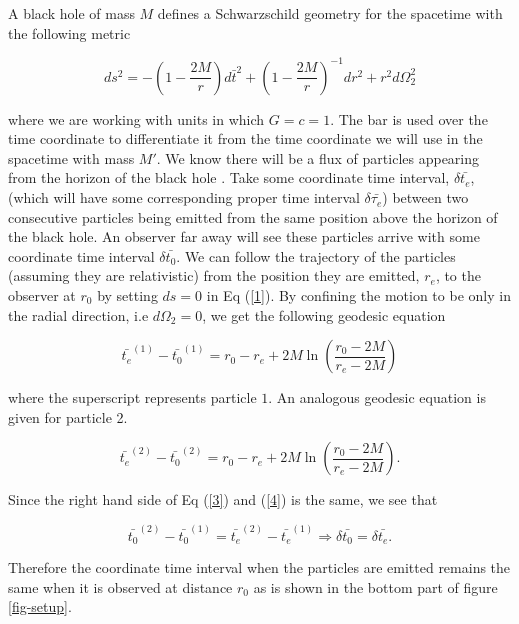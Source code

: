 \documentclass[aps,showpacs,onecolumn,floats,prd,superscriptaddress,nofootinbib]{revtex4-1}
\begin{document}
A black hole of mass $M$ defines a Schwarzschild geometry for the spacetime with the following metric 

\begin{equation}
	ds^2 = - \left( 1 -\frac{2M}{r} \right) d\bar{t}^2 + \left( 1 - \frac{2M}{r} \right)^{-1} dr^2 + r^2 d \Omega_2^2	\label{1}
\end{equation}

where we are working with units in which $G = c = 1$. The bar is used over the time coordinate to differentiate it from the time coordinate we will use in the spacetime with mass $M'$. We know there will be a flux of particles appearing from the horizon of the black hole \cite{Haw74}. Take some coordinate time interval, $\delta \bar{t_e}$, (which will have some corresponding proper time interval $\delta \bar{\tau_e}$) between two consecutive particles being emitted from the same position above the horizon of the black hole. An observer far away will see these particles arrive with some coordinate time interval $\delta \bar{t_0}$. We can follow the trajectory of the particles (assuming they are relativistic) from the position they are emitted, $r_e$, to the observer at $r_0$ by setting $ds = 0$ in Eq (\ref{1}). By confining the motion to be only in the radial direction, i.e $d \Omega_2 = 0$, we get the following geodesic equation

\begin{equation}
	\bar{t_e}^{(1)} - \bar{t_0}^{(1)} = r_0 - r_e + 2M \ln \left( \frac{r_0 - 2M}{r_e - 2M}  \right)	\label{3}
\end{equation}

where the superscript represents particle $1$. An analogous geodesic equation is given for particle 2. 

\begin{equation}
	\bar{t_e}^{(2)} - \bar{t_0}^{(2)} = r_0 - r_e + 2M \ln \left( \frac{r_0 - 2M}{r_e - 2M}  \right).	\label{4}
\end{equation}

Since the right hand side of Eq (\ref{3}) and (\ref{4}) is the same, we see that

\begin{equation}
	\bar{t_0}^{(2)} - \bar{t_0}^{(1)} = \bar{t_e}^{(2)} - \bar{t_e}^{(1)} \Rightarrow \delta \bar{t_0} = \delta \bar{t_e}.
\end{equation}

Therefore the coordinate time interval when the particles are emitted remains the same when it is observed at distance $r_0$ as is shown in the bottom part of figure \ref{fig-setup}.
\end{document}

